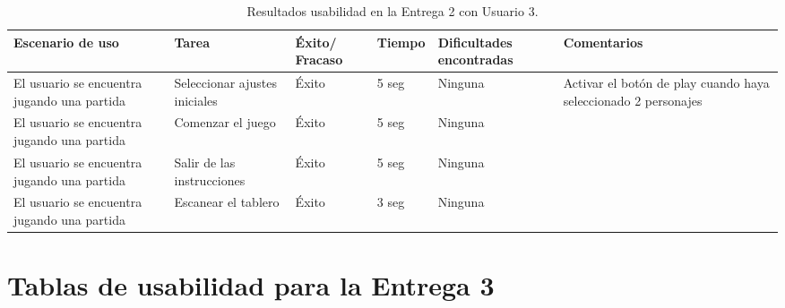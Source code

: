\begin{table}[h]
  \begin{center}
    \begin{tabular}{|p{2.5cm}|p{1.75cm}|p{1.25cm}|p{1.25cm}|p{2.75cm}|p{3.5cm}|}

      \hline
        \rowcolor{Gray} \textbf{Escenario de uso}
        & \textbf{Tarea}
        & \textbf{Éxito/ Fracaso}
        & \textbf{Tiempo}
        & \textbf{Dificultades encontradas}
        & \textbf{Comentarios}\\

      \hline
      El usuario se encuentra jugando una partida
      & Seleccionar ajustes iniciales
      & Éxito
      & 5 seg
      & Ninguna
      & Activar el botón de play cuando haya seleccionado 2 personajes\\

      \hline
      El usuario se encuentra jugando una partida
      & Comenzar el juego
      & Éxito
      & 5 seg
      & Ninguna
      &\\

      \hline
      El usuario se encuentra jugando una partida
      & Salir de las instrucciones
      & Éxito
      & 5 seg
      & Ninguna
      &\\

      \hline
      El usuario se encuentra jugando una partida
      & Escanear el tablero
      & Éxito
      & 3 seg
      & Ninguna
      &\\

      \hline

    \end{tabular}

    \caption{Resultados usabilidad en la Entrega 2 con Usuario 3.}
    \label{tabla-entrega-2-usuario3}

  \end{center}
\end{table}

\FloatBarrier


\section{Tablas de usabilidad para la Entrega 3} \label{tablas-usabilidad-entrega-3}

